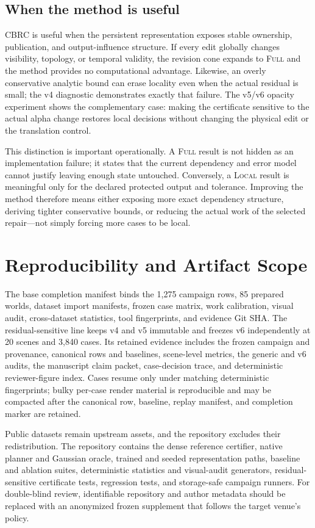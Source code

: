 \documentclass[acmtog,nonacm]{acmart}
\newcommand{\method}{CBRC}
\newcommand{\FULL}{\textsc{Full}}
\newcommand{\LOCAL}{\textsc{Local}}
\begin{document}
\subsection{When the method is useful}
\method{} is useful when the persistent representation exposes stable ownership, publication, and output-influence structure. If every edit globally changes visibility, topology, or temporal validity, the revision cone expands to \FULL{} and the method provides no computational advantage. Likewise, an overly conservative analytic bound can erase locality even when the actual residual is small; the v4 diagnostic demonstrates exactly that failure. The v5/v6 opacity experiment shows the complementary case: making the certificate sensitive to the actual alpha change restores local decisions without changing the physical edit or the translation control.

This distinction is important operationally. A \FULL{} result is not hidden as an implementation failure; it states that the current dependency and error model cannot justify leaving enough state untouched. Conversely, a \LOCAL{} result is meaningful only for the declared protected output and tolerance. Improving the method therefore means either exposing more exact dependency structure, deriving tighter conservative bounds, or reducing the actual work of the selected repair---not simply forcing more cases to be local.

\section{Reproducibility and Artifact Scope}
The base completion manifest binds the 1,275 campaign rows, 85 prepared worlds, dataset import manifests, frozen case matrix, work calibration, visual audit, cross-dataset statistics, tool fingerprints, and evidence Git SHA. The residual-sensitive line keeps v4 and v5 immutable and freezes v6 independently at 20 scenes and 3,840 cases. Its retained evidence includes the frozen campaign and provenance, canonical rows and baselines, scene-level metrics, the generic and v6 audits, the manuscript claim packet, case-decision trace, and deterministic reviewer-figure index. Cases resume only under matching deterministic fingerprints; bulky per-case render material is reproducible and may be compacted after the canonical row, baseline, replay manifest, and completion marker are retained.

Public datasets remain upstream assets, and the repository excludes their redistribution. The repository contains the dense reference certifier, native planner and Gaussian oracle, trained and seeded representation paths, baseline and ablation suites, deterministic statistics and visual-audit generators, residual-sensitive certificate tests, regression tests, and storage-safe campaign runners. For double-blind review, identifiable repository and author metadata should be replaced with an anonymized frozen supplement that follows the target venue's policy.
\end{document}

